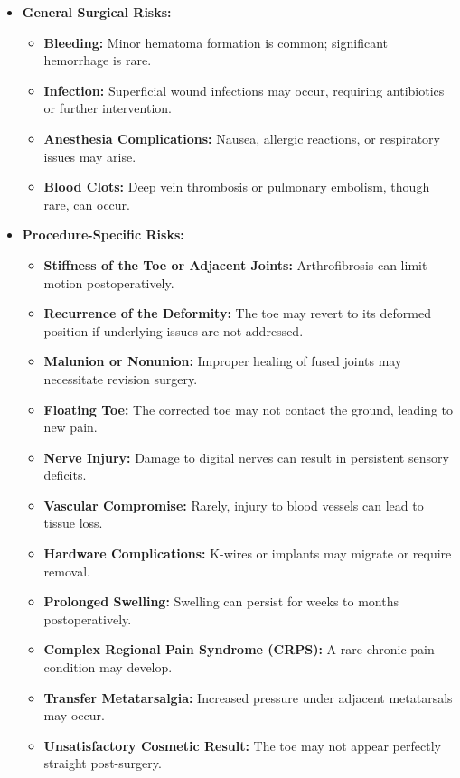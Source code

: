 \begin{itemize}
  \item \textbf{General Surgical Risks:}
    \begin{itemize}
      \item \textbf{Bleeding:} Minor hematoma formation is common; significant hemorrhage is rare.
      \item \textbf{Infection:} Superficial wound infections may occur, requiring antibiotics or further intervention.
      \item \textbf{Anesthesia Complications:} Nausea, allergic reactions, or respiratory issues may arise.
      \item \textbf{Blood Clots:} Deep vein thrombosis or pulmonary embolism, though rare, can occur.
    \end{itemize}
  
  \item \textbf{Procedure-Specific Risks:}
    \begin{itemize}
      \item \textbf{Stiffness of the Toe or Adjacent Joints:} Arthrofibrosis can limit motion postoperatively.
      \item \textbf{Recurrence of the Deformity:} The toe may revert to its deformed position if underlying issues are not addressed.
      \item \textbf{Malunion or Nonunion:} Improper healing of fused joints may necessitate revision surgery.
      \item \textbf{Floating Toe:} The corrected toe may not contact the ground, leading to new pain.
      \item \textbf{Nerve Injury:} Damage to digital nerves can result in persistent sensory deficits.
      \item \textbf{Vascular Compromise:} Rarely, injury to blood vessels can lead to tissue loss.
      \item \textbf{Hardware Complications:} K-wires or implants may migrate or require removal.
      \item \textbf{Prolonged Swelling:} Swelling can persist for weeks to months postoperatively.
      \item \textbf{Complex Regional Pain Syndrome (CRPS):} A rare chronic pain condition may develop.
      \item \textbf{Transfer Metatarsalgia:} Increased pressure under adjacent metatarsals may occur.
      \item \textbf{Unsatisfactory Cosmetic Result:} The toe may not appear perfectly straight post-surgery.
    \end{itemize}
\end{itemize}

